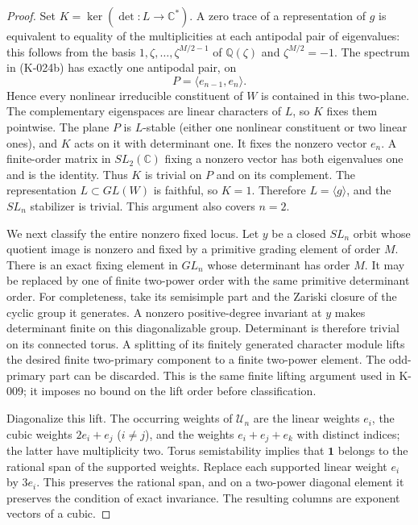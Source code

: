 \begin{proof}
Set $K=\ker(\det:L\to\mathbb C^*)$.  A zero trace of a
representation of $g$ is equivalent to equality of the
multiplicities at each antipodal pair of eigenvalues: this follows
from the basis $1,\zeta,\ldots,\zeta^{M/2-1}$ of
$\mathbb Q(\zeta)$ and $\zeta^{M/2}=-1$.
The spectrum in (K-024b) has exactly one antipodal pair, on
\[
                           P=\langle e_{n-1},e_n\rangle.
\]
Hence every nonlinear irreducible constituent of $W$ is contained
in this two-plane.  The complementary eigenspaces are linear
characters of $L$, so $K$ fixes them pointwise.  The plane $P$
is $L$-stable (either one nonlinear constituent or two linear
ones), and $K$ acts on it with determinant one.  It fixes the
nonzero vector $e_n$.  A finite-order matrix in $SL_2(\mathbb C)$
fixing a nonzero vector has both eigenvalues one and is the
identity.  Thus $K$ is trivial on $P$ and on its complement.
The representation $L\subset GL(W)$ is faithful, so $K=1$.
Therefore $L=\langle g\rangle$, and the $SL_n$ stabilizer is
trivial.  This argument also covers $n=2$.

We next classify the entire nonzero fixed locus.  Let $y$ be a
closed $SL_n$ orbit whose quotient image is nonzero and fixed by
a primitive grading element of order $M$.  There is an exact
fixing element in $GL_n$ whose determinant has order $M$.
It may be replaced by one of finite two-power order with the
same primitive determinant order.  For completeness, take its
semisimple part and the Zariski closure of the cyclic group it
generates.  A nonzero positive-degree invariant at $y$ makes
determinant finite on this diagonalizable group.  Determinant
is therefore trivial on its connected torus.  A splitting of
its finitely generated character module lifts the desired
finite two-primary component to a finite two-power element.
The odd-primary part can be discarded.  This is the same finite
lifting argument used in K-009; it imposes no bound on the lift
order before classification.

Diagonalize this lift.  The occurring weights of $\mathcal U_n$
are the linear weights $e_i$, the cubic weights $2e_i+e_j$
($i\ne j$), and the weights $e_i+e_j+e_k$ with distinct indices;
the latter have multiplicity two.  Torus semistability implies
that $\mathbf1$ belongs to the rational span of the supported
weights.  Replace each supported linear weight $e_i$ by $3e_i$.
This preserves the rational span, and on a two-power diagonal
element it preserves the condition of exact invariance.
The resulting columns are exponent vectors of a cubic.


\end{proof}
